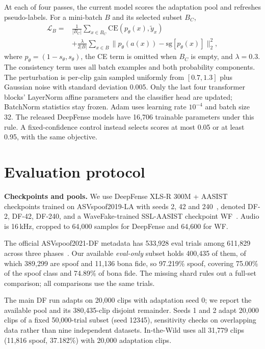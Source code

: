 \documentclass[10pt,letterpaper]{article}
\begin{document}
At each of four passes, the current model scores the adaptation pool and
refreshes pseudo-labels. For a mini-batch $B$ and its selected subset $B_C$,
\begin{equation}
 \begin{aligned}
 \mathcal L_B ={}&
 \frac{1}{|B_C|}\sum_{x\in B_C}\!\mathrm{CE}(p_\theta(x),\tilde y_x)
 \\ &+\frac{\lambda}{2|B|}\sum_{x\in B}
 \|p_\theta(a(x))-\mathrm{sg}[p_\theta(x)]\|_2^2,
 \end{aligned}
 \label{eq:loss}
\end{equation}
where $p_\theta=(1-s_\theta,s_\theta)$, the CE term is omitted when $B_C$ is
empty, and $\lambda=0.3$. The consistency term uses all batch examples and both
probability components. The perturbation is per-clip gain sampled uniformly
from $[0.7,1.3]$ plus Gaussian noise with standard deviation 0.005. Only the
last four transformer blocks' LayerNorm affine parameters and the classifier
head are updated; BatchNorm statistics stay frozen. Adam uses learning rate
$10^{-4}$ and batch size 32. The released DeepFense models have 16,706 trainable
parameters under this rule. A fixed-confidence control instead selects scores
at most 0.05 or at least 0.95, with the same objective.

\section{Evaluation protocol}
\label{sec:protocol}
\textbf{Checkpoints and pools.} We use DeepFense XLS-R 300M + AASIST
checkpoints trained on ASVspoof2019-LA with seeds 2, 42 and
240~\cite{deepfense,deepfenseweights}, denoted DF-2, DF-42, DF-240, and a
WaveFake-trained SSL-AASIST checkpoint WF~\cite{shiftyspeech}. Audio is
16\,kHz, cropped to 64,000 samples for DeepFense and 64,600 for WF.

The official ASVspoof2021-DF metadata has 533,928 eval trials among 611,829
across three phases~\cite{asvspoof21}. Our available \emph{eval-only} subset
holds 400,435 of them, of which 389,299 are spoof and 11,136 bona fide, so
97.219\% spoof, covering 75.00\% of the spoof class and 74.89\% of bona fide.
The missing shard rules out a full-set comparison; all comparisons use the
same trials.

The main DF run adapts on 20,000 clips with adaptation seed 0; we report the
available pool and its 380,435-clip disjoint remainder. Seeds 1 and 2 adapt
20,000 clips of a fixed 50,000-trial subset (seed 12345), sensitivity checks on
overlapping data rather than nine independent datasets. In-the-Wild uses all
31,779 clips (11,816 spoof, 37.182\%) with 20,000 adaptation clips.
\end{document}
